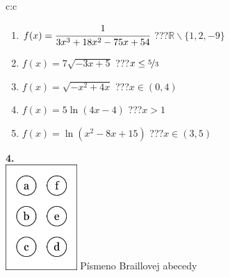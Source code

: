 \documentclass[10pt]{report}
\begin{document}
\begin{tabular}{c:c}
\begin{minipage}[c][104.5mm][t]{0.5\linewidth}
\begin{center}
\begin{minipage}{0.79\linewidth}
\begin{center}
\begin{varwidth}{\linewidth}
\begin{enumerate}
\item $f(x)=\cfrac{1}{3x^3+18x^2-75x+54}$\quad \dotfill\; ???\;\dotfill \quad $\mathbb{R}\smallsetminus\{1,2,-9\}$
\item $f(x)=7\sqrt{-3x+5}$\quad \dotfill\; ???\;\dotfill \quad $x\leq\nicefrac{5}{3}$
\item $f(x)=\sqrt{-x^2+4x}$\quad \dotfill\; ???\;\dotfill \quad $x\in(0 , 4)$
\item $f(x)=5\ln{(4x-4)}$\quad \dotfill\; ???\;\dotfill \quad $x>1$
\item $f(x)=\ln{(x^2-8x+15)}$\quad \dotfill\; ???\;\dotfill \quad $x\in(3 , 5)$
\end{enumerate}
\end{varwidth}
\end{center}
\end{minipage}
\begin{minipage}{0.20\linewidth}
\begin{center}
{\Huge\bfseries 4.} \\[2mm]
\includegraphics[height=40mm]{../images/braille.png}
{\small Písmeno Braillovej abecedy}
\end{center}
\end{minipage}
\end{center}
\end{minipage}
%
\end{tabular}
\newpage
\thispagestyle{empty}
\end{document}
